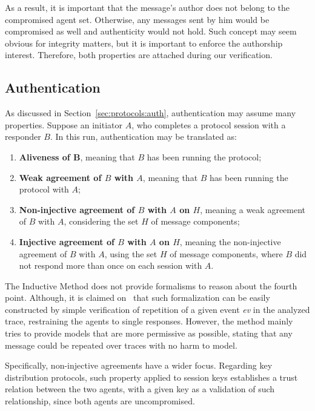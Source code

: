 As a result, it is important that the message's author does not belong to the compromised agent set. Otherwise, any messages sent by him would be compromised as well and authenticity would not hold. Such concept may seem obvious for integrity matters, but it is important to enforce the authorship interest. Therefore, both properties are attached during our verification.



\subsection{Authentication}
As discussed in Section~\ref{sec:protocols:auth}, authentication may assume many properties. Suppose an initiator \(A\), who completes a protocol session with a responder \(B\). In this run, authentication may be translated as:

\begin{enumerate}
  \item \textbf{Aliveness of B}, meaning that \(B\) has been running the protocol;
  \item \textbf{Weak agreement of \(B\) with \(A\)}, meaning that \(B\) has been running the protocol with \(A\);
  \item \textbf{Non-injective agreement of \(B\) with \(A\) on \(H\)}, meaning a weak agreement of \(B\) with \(A\), considering the set \(H\) of message components;
  \item \textbf{Injective agreement of \(B\) with \(A\) on \(H\)}, meaning the non-injective agreement of \(B\) with \(A\), using the set \(H\) of message components, where \(B\) did not respond more than once on each session with \(A\).
\end{enumerate}

The Inductive Method does not provide formalisms to reason about the fourth point. Although, it is claimed on~\cite{Bella2007} that such formalization can be easily constructed by simple verification of repetition of a given event \textit{ev} in the analyzed trace, restraining the agents to single responses. However, the method mainly tries to provide models that are more permissive as possible, stating that any message could be repeated over traces with no harm to model.

Specifically, non-injective agreements have a wider focus. Regarding key distribution protocols, such property applied to session keys establishes a trust relation between the two agents, with a given key as a validation of such relationship, since both agents are uncompromised.

